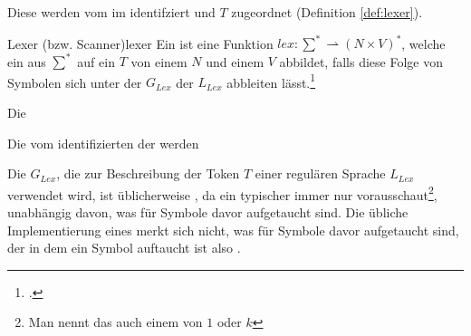 Diese  werden vom  im  identifziert und  $T$ zugeordnet (Definition \ref{def:lexer}).

\begin{Definition}{Lexer (bzw. Scanner)}{lexer}
  Ein  ist eine  Funktion \hspace{0.2cm}$lex: \sum^{*} \rightharpoonup (N \times V)^{*}$, welche ein  aus $\sum^{*}$ auf ein  $T$ von einem  $N$ und einem   $V$ abbildet, falls diese Folge von Symbolen sich unter der  ${G}_{Lex}$ der  ${L_{Lex}}$ abbleiten lässt.\footcite{noauthor_lecture-notes-2021_2022}
\end{Definition}

Die %

Die vom  identifizierten  der   werden


\begin{special_paragraph}
  Die  $G_{Lex}$, die zur Beschreibung der Token $T$ einer regulären Sprache $L_{Lex}$ verwendet wird, ist üblicherweise , da ein typischer  immer nur  vorausschaut\footnote{Man nennt das auch einem  von $1$ oder $k$}, unabhängig davon, was für Symbole davor aufgetaucht sind. Die übliche Implementierung eines  merkt sich nicht, was für Symbole davor aufgetaucht sind, der  in dem ein Symbol auftaucht ist also .
\end{special_paragraph}

